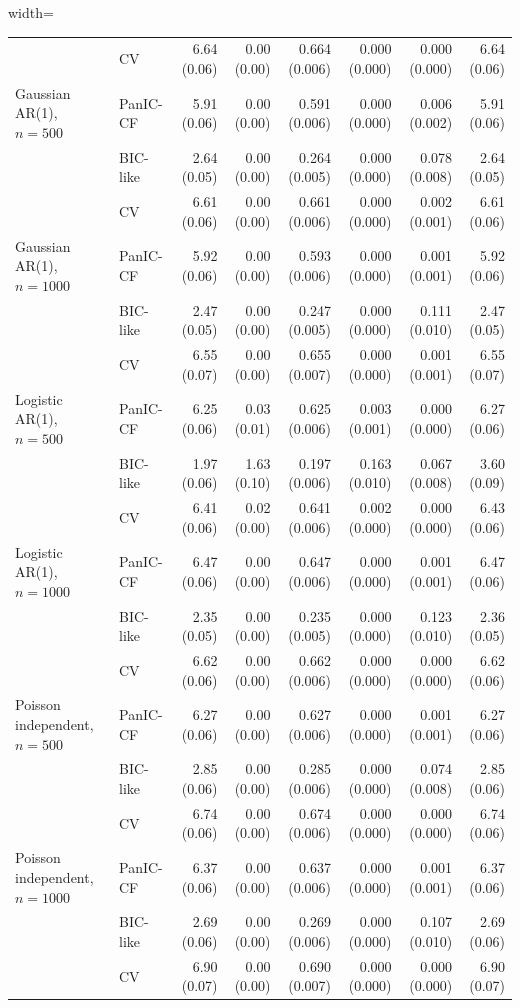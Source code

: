 \documentclass[12pt]{article}
\newenvironment{bluechange}{\begingroup\color[rgb]{0.00,0.00,1.00}}{\endgroup}
\theoremstyle{remark}
\theoremstyle{plain}
\begin{document}
\begin{bluechange}
\begin{table}[H]
\begin{adjustbox}{width=\textwidth}
\begin{tabular}{llrrrrrr}
 & CV & 6.64 (0.06) & 0.00 (0.00) & 0.664 (0.006) & 0.000 (0.000) & 0.000 (0.000) & 6.64 (0.06) \\
Gaussian AR(1), $n=500$ & PanIC-CF & 5.91 (0.06) & 0.00 (0.00) & 0.591 (0.006) & 0.000 (0.000) & 0.006 (0.002) & 5.91 (0.06) \\
 & BIC-like & 2.64 (0.05) & 0.00 (0.00) & 0.264 (0.005) & 0.000 (0.000) & 0.078 (0.008) & 2.64 (0.05) \\
 & CV & 6.61 (0.06) & 0.00 (0.00) & 0.661 (0.006) & 0.000 (0.000) & 0.002 (0.001) & 6.61 (0.06) \\
Gaussian AR(1), $n=1000$ & PanIC-CF & 5.92 (0.06) & 0.00 (0.00) & 0.593 (0.006) & 0.000 (0.000) & 0.001 (0.001) & 5.92 (0.06) \\
 & BIC-like & 2.47 (0.05) & 0.00 (0.00) & 0.247 (0.005) & 0.000 (0.000) & 0.111 (0.010) & 2.47 (0.05) \\
 & CV & 6.55 (0.07) & 0.00 (0.00) & 0.655 (0.007) & 0.000 (0.000) & 0.001 (0.001) & 6.55 (0.07) \\
Logistic AR(1), $n=500$ & PanIC-CF & 6.25 (0.06) & 0.03 (0.01) & 0.625 (0.006) & 0.003 (0.001) & 0.000 (0.000) & 6.27 (0.06) \\
 & BIC-like & 1.97 (0.06) & 1.63 (0.10) & 0.197 (0.006) & 0.163 (0.010) & 0.067 (0.008) & 3.60 (0.09) \\
 & CV & 6.41 (0.06) & 0.02 (0.00) & 0.641 (0.006) & 0.002 (0.000) & 0.000 (0.000) & 6.43 (0.06) \\
Logistic AR(1), $n=1000$ & PanIC-CF & 6.47 (0.06) & 0.00 (0.00) & 0.647 (0.006) & 0.000 (0.000) & 0.001 (0.001) & 6.47 (0.06) \\
 & BIC-like & 2.35 (0.05) & 0.00 (0.00) & 0.235 (0.005) & 0.000 (0.000) & 0.123 (0.010) & 2.36 (0.05) \\
 & CV & 6.62 (0.06) & 0.00 (0.00) & 0.662 (0.006) & 0.000 (0.000) & 0.000 (0.000) & 6.62 (0.06) \\
Poisson independent, $n=500$ & PanIC-CF & 6.27 (0.06) & 0.00 (0.00) & 0.627 (0.006) & 0.000 (0.000) & 0.001 (0.001) & 6.27 (0.06) \\
 & BIC-like & 2.85 (0.06) & 0.00 (0.00) & 0.285 (0.006) & 0.000 (0.000) & 0.074 (0.008) & 2.85 (0.06) \\
 & CV & 6.74 (0.06) & 0.00 (0.00) & 0.674 (0.006) & 0.000 (0.000) & 0.000 (0.000) & 6.74 (0.06) \\
Poisson independent, $n=1000$ & PanIC-CF & 6.37 (0.06) & 0.00 (0.00) & 0.637 (0.006) & 0.000 (0.000) & 0.001 (0.001) & 6.37 (0.06) \\
 & BIC-like & 2.69 (0.06) & 0.00 (0.00) & 0.269 (0.006) & 0.000 (0.000) & 0.107 (0.010) & 2.69 (0.06) \\
 & CV & 6.90 (0.07) & 0.00 (0.00) & 0.690 (0.007) & 0.000 (0.000) & 0.000 (0.000) & 6.90 (0.07) \\
\hline
\end{tabular}
\end{adjustbox}
\end{table}



\end{bluechange}
\end{document}
